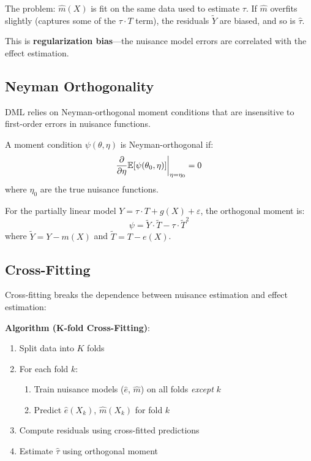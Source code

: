 The problem: $\hat{m}(X)$ is fit on the same data used to estimate $\tau$. If $\hat{m}$ overfits slightly (captures some of the $\tau \cdot T$ term), the residuals $\tilde{Y}$ are biased, and so is $\hat{\tau}$.

This is \textbf{regularization bias}---the nuisance model errors are correlated with the effect estimation.

\subsection{Neyman Orthogonality}

DML relies on Neyman-orthogonal moment conditions that are insensitive to first-order errors in nuisance functions.

\begin{definition}
A moment condition $\psi(\theta, \eta)$ is Neyman-orthogonal if:
\begin{equation}
\frac{\partial}{\partial \eta} \mathbb{E}[\psi(\theta_0, \eta)]\bigg|_{\eta = \eta_0} = 0
\end{equation}
where $\eta_0$ are the true nuisance functions.
\end{definition}

For the partially linear model $Y = \tau \cdot T + g(X) + \varepsilon$, the orthogonal moment is:
\begin{equation}
\psi = \tilde{Y} \cdot \tilde{T} - \tau \cdot \tilde{T}^2
\end{equation}
where $\tilde{Y} = Y - m(X)$ and $\tilde{T} = T - e(X)$.

\subsection{Cross-Fitting}

Cross-fitting breaks the dependence between nuisance estimation and effect estimation:

\medskip
\noindent\textbf{Algorithm (K-fold Cross-Fitting)}:
\begin{enumerate}
    \item Split data into $K$ folds
    \item For each fold $k$:
    \begin{enumerate}
        \item Train nuisance models ($\hat{e}$, $\hat{m}$) on all folds \emph{except} $k$
        \item Predict $\hat{e}(X_k)$, $\hat{m}(X_k)$ for fold $k$
    \end{enumerate}
    \item Compute residuals using cross-fitted predictions
    \item Estimate $\hat{\tau}$ using orthogonal moment
\end{enumerate}

